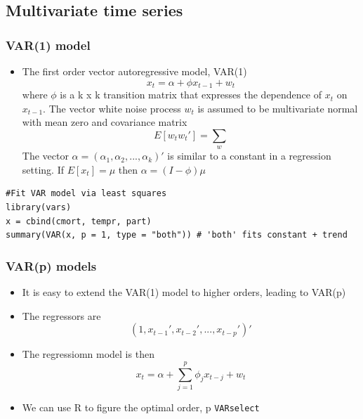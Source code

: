 \documentclass{article}
\begin{document}
\subsection{Multivariate time series}

\subsubsection{VAR(1) model}
\begin{itemize}
    \item The first order vector autoregressive model, VAR(1) 
    \begin{equation*}
        x_t = \alpha + \phi x_{t-1} + w_t
    \end{equation*}
    where $\phi$ is a k x k transition matrix that expresses the dependence of $x_t$ on $x_{t-1}$. The vector white noise process $w_t$ is assumed to be multivariate normal with mean zero and covariance matrix
    \begin{equation*}
        E[w_t w_t'] = \sum_w
    \end{equation*}
    The vector $\alpha = (\alpha_1, \alpha_2, ..., \alpha_k)' $ is similar to a constant in a regression setting. If $E[x_t] = \mu$ then $\alpha = (I-\phi)\mu$ 
\end{itemize}

\begin{lstlisting}
#Fit VAR model via least squares
library(vars)
x = cbind(cmort, tempr, part)
summary(VAR(x, p = 1, type = "both")) # 'both' fits constant + trend
\end{lstlisting}

\subsubsection{VAR(p) models}

\begin{itemize}
    \item It is easy to extend the VAR(1) model to higher orders, leading to VAR(p)
    \item The regressors are 
    \begin{equation*}
        (1,x_{t-1}',x_{t-2}' ,..., x_{t-p}')'
    \end{equation*}
    \item The regressiomn model is then
    \begin{equation*}
        x_t = \alpha + \sum_{j=1}^p \phi_j x_{t-j} + w_t
    \end{equation*}
    \item We can use R to figure the optimal order, p \texttt{VARselect}
\end{itemize}
\end{document}
